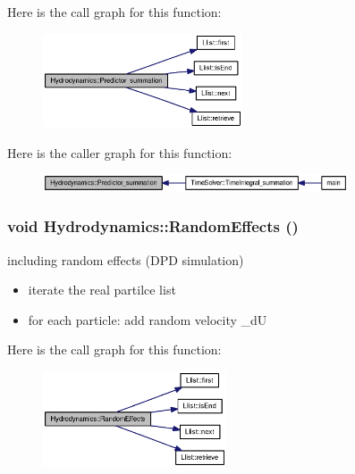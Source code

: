 Here is the call graph for this function:\nopagebreak
\begin{figure}[H]
\begin{center}
\leavevmode
\includegraphics[width=167pt]{classHydrodynamics_911fe25b94fec398fad1f2def036d755_cgraph}
\end{center}
\end{figure}


Here is the caller graph for this function:\nopagebreak
\begin{figure}[H]
\begin{center}
\leavevmode
\includegraphics[width=256pt]{classHydrodynamics_911fe25b94fec398fad1f2def036d755_icgraph}
\end{center}
\end{figure}
\hypertarget{classHydrodynamics_8f826d2003ca7a4782b028b761a26421}{
\subsubsection[{RandomEffects}]{\setlength{\rightskip}{0pt plus 5cm}void Hydrodynamics::RandomEffects ()}}
\label{classHydrodynamics_8f826d2003ca7a4782b028b761a26421}


including random effects (DPD simulation) 



\begin{itemize}
\item iterate the real partilce list\end{itemize}


\begin{itemize}
\item for each particle: add random velocity \_\-dU \end{itemize}


Here is the call graph for this function:\nopagebreak
\begin{figure}[H]
\begin{center}
\leavevmode
\includegraphics[width=154pt]{classHydrodynamics_8f826d2003ca7a4782b028b761a26421_cgraph}
\end{center}
\end{figure}


